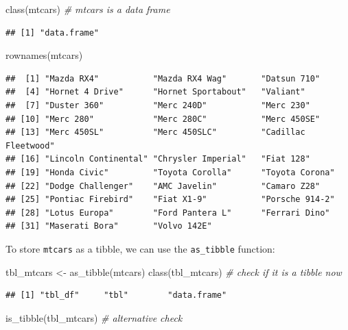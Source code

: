 \documentclass[
  12pt,
  oneside]{book}
\newenvironment{Shaded}{\begin{snugshade}}{\end{snugshade}}
\newcommand{\CommentTok}[1]{\textcolor[rgb]{0.56,0.35,0.01}{\textit{#1}}}
\newcommand{\FunctionTok}[1]{\textcolor[rgb]{0.00,0.00,0.00}{#1}}
\newcommand{\NormalTok}[1]{#1}
\newcommand{\OtherTok}[1]{\textcolor[rgb]{0.56,0.35,0.01}{#1}}
\theoremstyle{definition}
\theoremstyle{definition}
\theoremstyle{definition}
\theoremstyle{definition}
\theoremstyle{remark}
\begin{document}
\begin{Shaded}
\begin{Highlighting}[]
\FunctionTok{class}\NormalTok{(mtcars) }\CommentTok{\# mtcars is a data frame}
\end{Highlighting}
\end{Shaded}

\begin{verbatim}
## [1] "data.frame"
\end{verbatim}

\begin{Shaded}
\begin{Highlighting}[]
\FunctionTok{rownames}\NormalTok{(mtcars) }
\end{Highlighting}
\end{Shaded}

\begin{verbatim}
##  [1] "Mazda RX4"           "Mazda RX4 Wag"       "Datsun 710"         
##  [4] "Hornet 4 Drive"      "Hornet Sportabout"   "Valiant"            
##  [7] "Duster 360"          "Merc 240D"           "Merc 230"           
## [10] "Merc 280"            "Merc 280C"           "Merc 450SE"         
## [13] "Merc 450SL"          "Merc 450SLC"         "Cadillac Fleetwood" 
## [16] "Lincoln Continental" "Chrysler Imperial"   "Fiat 128"           
## [19] "Honda Civic"         "Toyota Corolla"      "Toyota Corona"      
## [22] "Dodge Challenger"    "AMC Javelin"         "Camaro Z28"         
## [25] "Pontiac Firebird"    "Fiat X1-9"           "Porsche 914-2"      
## [28] "Lotus Europa"        "Ford Pantera L"      "Ferrari Dino"       
## [31] "Maserati Bora"       "Volvo 142E"
\end{verbatim}

To store \texttt{mtcars} as a tibble, we can use the \texttt{as\_tibble} function:

\begin{Shaded}
\begin{Highlighting}[]
\NormalTok{tbl\_mtcars }\OtherTok{\textless{}{-}} \FunctionTok{as\_tibble}\NormalTok{(mtcars)}
\FunctionTok{class}\NormalTok{(tbl\_mtcars) }\CommentTok{\# check if it is a tibble now}
\end{Highlighting}
\end{Shaded}

\begin{verbatim}
## [1] "tbl_df"     "tbl"        "data.frame"
\end{verbatim}

\begin{Shaded}
\begin{Highlighting}[]
\FunctionTok{is\_tibble}\NormalTok{(tbl\_mtcars) }\CommentTok{\# alternative check}
\end{Highlighting}
\end{Shaded}
\end{document}
